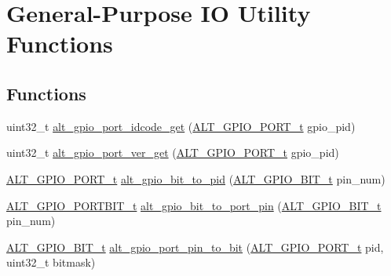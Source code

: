 \hypertarget{group__ALT__GPIO__UTILITY}{}\section{General-\/\+Purpose IO Utility Functions}
\label{group__ALT__GPIO__UTILITY}
\subsection*{Functions}
\begin{DoxyCompactItemize}
\item 
uint32\+\_\+t \mbox{\hyperlink{group__ALT__GPIO__UTILITY_gaa3196e9d9d2efee9f473e654f2ca3f8b}{alt\+\_\+gpio\+\_\+port\+\_\+idcode\+\_\+get}} (\mbox{\hyperlink{group__ALT__GPIO__API__CONFIG_gaaf1cf0e2a720d20cd883810f2b59097e}{A\+L\+T\+\_\+\+G\+P\+I\+O\+\_\+\+P\+O\+R\+T\+\_\+t}} gpio\+\_\+pid)
\item 
uint32\+\_\+t \mbox{\hyperlink{group__ALT__GPIO__UTILITY_ga2a5551eef99ee5b725a4776dbc84097a}{alt\+\_\+gpio\+\_\+port\+\_\+ver\+\_\+get}} (\mbox{\hyperlink{group__ALT__GPIO__API__CONFIG_gaaf1cf0e2a720d20cd883810f2b59097e}{A\+L\+T\+\_\+\+G\+P\+I\+O\+\_\+\+P\+O\+R\+T\+\_\+t}} gpio\+\_\+pid)
\item 
\mbox{\hyperlink{group__ALT__GPIO__API__CONFIG_gaaf1cf0e2a720d20cd883810f2b59097e}{A\+L\+T\+\_\+\+G\+P\+I\+O\+\_\+\+P\+O\+R\+T\+\_\+t}} \mbox{\hyperlink{group__ALT__GPIO__UTILITY_gab9f4dc7b353a6152d22205dcc1b62e4c}{alt\+\_\+gpio\+\_\+bit\+\_\+to\+\_\+pid}} (\mbox{\hyperlink{group__ALT__GPIO__BITVIEW_ga6d149a5961bef8b91b8108e3838b1e09}{A\+L\+T\+\_\+\+G\+P\+I\+O\+\_\+B\+I\+T\+\_\+t}} pin\+\_\+num)
\item 
\mbox{\hyperlink{group__ALT__GPIO__API__CONFIG_gae4215fdba724cf1aa2ddefdcadabe622}{A\+L\+T\+\_\+\+G\+P\+I\+O\+\_\+\+P\+O\+R\+T\+B\+I\+T\+\_\+t}} \mbox{\hyperlink{group__ALT__GPIO__UTILITY_gabb884ac27ac7812efe6286a5162f6241}{alt\+\_\+gpio\+\_\+bit\+\_\+to\+\_\+port\+\_\+pin}} (\mbox{\hyperlink{group__ALT__GPIO__BITVIEW_ga6d149a5961bef8b91b8108e3838b1e09}{A\+L\+T\+\_\+\+G\+P\+I\+O\+\_\+B\+I\+T\+\_\+t}} pin\+\_\+num)
\item 
\mbox{\hyperlink{group__ALT__GPIO__BITVIEW_ga6d149a5961bef8b91b8108e3838b1e09}{A\+L\+T\+\_\+\+G\+P\+I\+O\+\_\+B\+I\+T\+\_\+t}} \mbox{\hyperlink{group__ALT__GPIO__UTILITY_gaceec1bfadaad84d3a382dba9c8a78934}{alt\+\_\+gpio\+\_\+port\+\_\+pin\+\_\+to\+\_\+bit}} (\mbox{\hyperlink{group__ALT__GPIO__API__CONFIG_gaaf1cf0e2a720d20cd883810f2b59097e}{A\+L\+T\+\_\+\+G\+P\+I\+O\+\_\+\+P\+O\+R\+T\+\_\+t}} pid, uint32\+\_\+t bitmask)
\end{DoxyCompactItemize}


